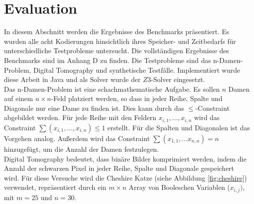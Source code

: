 \documentclass[a4,abstract=on]{scrartcl}
\newcommand*\stdsection{}
\let\stdsection\section
\renewcommand*\section{%
    \clearpage\ifodd\value{page}\else\mbox{}\clearpage\fi
    \stdsection}
\begin{document}
\section{Evaluation}
In diesem Abschnitt werden die Ergebnisse des Benchmarks präsentiert. Es wurden alle acht Kodierungen hinsichtlich ihres Speicher- und Zeitbedarfs für unterschiedliche Testprobleme untersucht. Die vollständigen Ergebnisse des Benchmarks sind im Anhang D zu finden. Die Testprobleme sind das n-Damen-Problem, Digital Tomography und synthetische Testfälle. Implementiert wurde diese Arbeit in Java und als Solver wurde der $Z3$-Solver eingesetzt.\\
Das n-Damen-Problem ist eine schachmathematische Aufgabe. Es sollen $n$ Damen auf einem $n\times n$-Feld platziert werden, so dass in jeder Reihe, Spalte und Diagonale nur eine Dame zu finden ist. Dies kann durch das $\leq$-Constraint abgebildet werden. Für jede Reihe mit den Feldern $x_{i,1}, \dots, x_{i,n}$ wird das Constraint $\sum (x_{i,1}, \dots, x_{i,n}) \leq 1$ erstellt. Für die Spalten und Diagonalen ist das Vorgehen analog. Außerdem wird das Constraint $\sum (x_{1,1}, \dots x_{n,n})=n$ hinzugefügt, um die Anzahl der Damen festzulegen.\\
Digital Tomography bedeutet, dass binäre Bilder komprimiert werden, indem die Anzahl der schwarzen Pixel in jeder Reihe, Spalte und Diagonale gespeichert wird. Für diese Versuche wird die Cheshire Katze (siehe Abbildung \ref{fig:cheshire}) verwendet, repräsentiert durch ein $m \times n$ Array von Booleschen Variablen ($x_{i,j})$, mit $m=25$ und $n=30$. 
\end{document}
